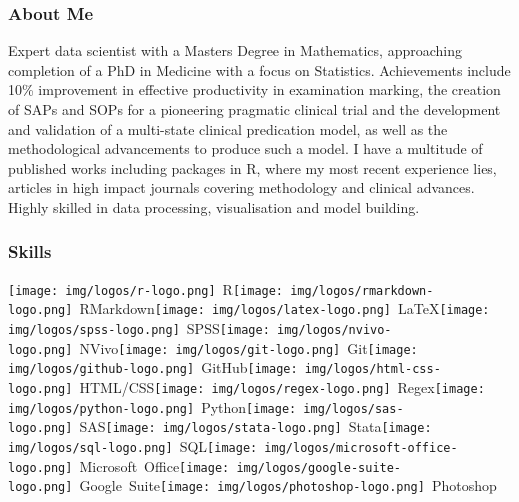 \documentclass[
]{article}
\begin{document}
\begin{multicols}{2}
\hypertarget{about-me}{%
\subsubsection{About Me}\label{about-me}}

Expert data scientist with a Masters Degree in Mathematics, approaching
completion of a PhD in Medicine with a focus on Statistics. Achievements
include 10\% improvement in effective productivity in examination
marking, the creation of SAPs and SOPs for a pioneering pragmatic
clinical trial and the development and validation of a multi-state
clinical predication model, as well as the methodological advancements
to produce such a model. I have a multitude of published works including
packages in R, where my most recent experience lies, articles in high
impact journals covering methodology and clinical advances. Highly
skilled in data processing, visualisation and model building.

\hypertarget{skills}{%
\subsubsection{Skills}\label{skills}}

\mbox{\texttt{[image:  img/logos/r-logo.png]} R}\quad\mbox{\texttt{[image:  img/logos/rmarkdown-logo.png]} RMarkdown}\quad\mbox{\texttt{[image:  img/logos/latex-logo.png]} LaTeX}\quad\mbox{\texttt{[image:  img/logos/spss-logo.png]} SPSS}\quad\mbox{\texttt{[image:  img/logos/nvivo-logo.png]} NVivo}\quad\mbox{\texttt{[image:  img/logos/git-logo.png]} Git}\quad\mbox{\texttt{[image:  img/logos/github-logo.png]} GitHub}\quad\mbox{\texttt{[image:  img/logos/html-css-logo.png]} HTML/CSS}\quad\mbox{\texttt{[image:  img/logos/regex-logo.png]} Regex}\quad\mbox{\texttt{[image:  img/logos/python-logo.png]} Python}\quad\mbox{\texttt{[image:  img/logos/sas-logo.png]} SAS}\quad\mbox{\texttt{[image:  img/logos/stata-logo.png]} Stata}\quad\mbox{\texttt{[image:  img/logos/sql-logo.png]} SQL}\quad\mbox{\texttt{[image:  img/logos/microsoft-office-logo.png]} Microsoft Office}\quad\mbox{\texttt{[image:  img/logos/google-suite-logo.png]} Google Suite}\quad\mbox{\texttt{[image:  img/logos/photoshop-logo.png]} Photoshop}

\hypertarget{section-1}{%
\subsubsection{}\label{section-1}}

\end{multicols}
\end{document}
